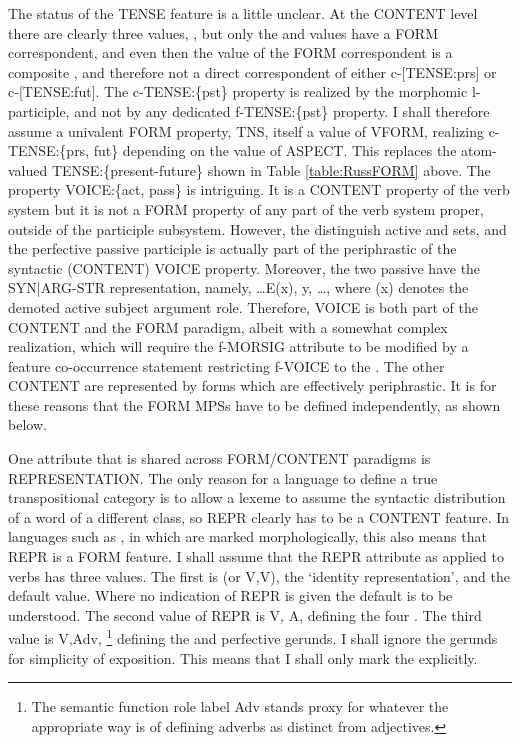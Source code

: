 \documentclass[output=paper,
modfonts
]{LSP/langsci}
\begin{document}
The status of the TENSE feature is a little unclear. At the CONTENT level there are clearly three values, , but only the  and  values have a FORM correspondent, and even then the value of the FORM correspondent is a composite , and therefore not a direct correspondent of either c-[TENSE:prs] or c-[TENSE:fut]. The c-TENSE:\{pst\} property is realized by the morphomic l-participle, and not by any dedicated f-TENSE:\{pst\} property. I shall therefore assume a univalent FORM property, TNS, itself a value of VFORM, realizing c-TENSE:\{prs, fut\} depending on the value of ASPECT. %
This replaces the atom-valued TENSE:\{present-future\} shown in Table \ref{table:RussFORM} above. %
The property VOICE:\{act, pass\} is intriguing. It is a CONTENT property of the verb system but it is not a FORM property of any part of the verb system proper, outside of the participle subsystem. However, the  distinguish active and  sets, and the perfective passive participle is actually part of the periphrastic  of the syntactic (CONTENT) VOICE property. Moreover, the two passive  have the  SYN|ARG-STR representation, namely, \ldots\lab E\lab(x), y, \dots\rab, where (x) denotes the demoted active subject argument role. Therefore, VOICE is both part of the CONTENT and the FORM paradigm, albeit with a somewhat complex realization, which will require the f-MORSIG attribute to be modified by a feature co-occurrence statement restricting f-VOICE to the . %
The other CONTENT   are represented by forms which are effectively periphrastic. It is for these reasons  that the FORM MPSs have to be defined independently, as shown below. 
 
 One attribute that is shared across FORM/CONTENT paradigms is REPRESENTATION. The only reason for a language to define a true transpositional category is to allow a lexeme to assume the syntactic distribution of a word of a different class, so REPR clearly has to be a CONTENT feature. In languages such as , in which  are marked morphologically, this also means that REPR is a FORM feature. %
 I shall assume that the REPR attribute as applied to verbs has three values. The first is  (or \lab V,V\rab), the ‘identity representation’, and the default value. Where no indication of REPR is given the default is to be understood.  The second value of REPR is \lab V, A\rab, defining the four .   %
 The third value is \lab V,Adv\rab,%
 \footnote{The semantic function role label Adv stands proxy for whatever the appropriate way is of defining adverbs as distinct from adjectives.} %
defining the  and perfective gerunds. I shall ignore the gerunds for simplicity of exposition. This means that I shall only mark the  explicitly.
\end{document}
